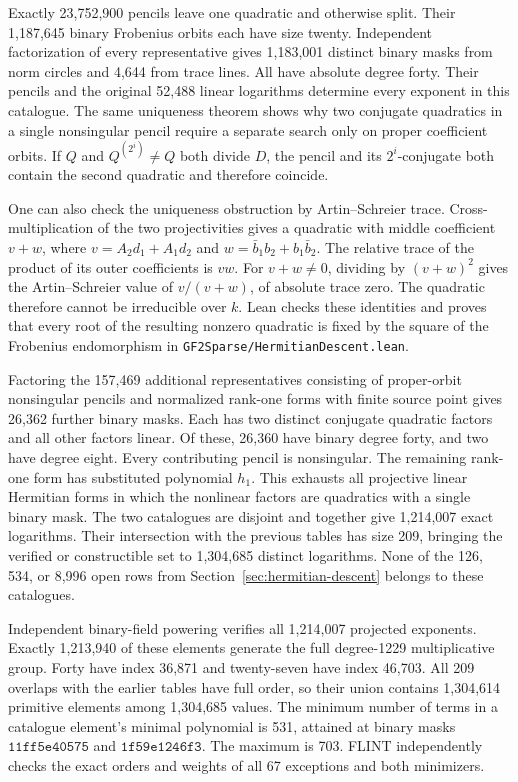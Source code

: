 \documentclass[11pt]{article}
\begin{document}
Exactly 23,752,900 pencils leave one quadratic and otherwise split.
Their 1,187,645 binary Frobenius orbits each have size twenty.
Independent factorization of every representative gives 1,183,001
distinct binary masks from norm circles and 4,644 from trace lines.
All have absolute degree forty. Their pencils and the original
52,488 linear logarithms determine every exponent in this catalogue.
The same uniqueness theorem shows why two conjugate quadratics in a
single nonsingular pencil require a separate search only on proper
coefficient orbits. If \(Q\) and \(Q^{(2^i)}\ne Q\) both divide
\(D\), the pencil and its \(2^i\)-conjugate both contain the
second quadratic and therefore coincide.

One can also check the uniqueness obstruction by Artin--Schreier
trace. Cross-multiplication of the two projectivities gives a
quadratic with middle coefficient \(v+w\), where
\(v=A_2d_1+A_1d_2\) and \(w=\bar b_1 b_2+b_1\bar b_2\).
The relative trace of the product of its outer coefficients is
\(vw\). For \(v+w\ne0\), dividing by \((v+w)^2\) gives the
Artin--Schreier value of \(v/(v+w)\), of absolute trace zero.
The quadratic therefore cannot be irreducible over \(k\).
Lean checks these identities and proves that every root of the
resulting nonzero quadratic is fixed by the square of the
Frobenius endomorphism in
\nolinkurl{GF2Sparse/HermitianDescent.lean}.

Factoring the 157,469 additional representatives consisting of
proper-orbit nonsingular pencils and normalized rank-one forms
with finite source point gives 26,362 further binary masks.
Each has two distinct conjugate quadratic factors and all other
factors linear. Of these, 26,360 have binary degree forty, and
two have degree eight. Every contributing pencil is nonsingular.
The remaining rank-one form has substituted polynomial \(h_1\).
This exhausts all projective linear Hermitian forms in which the
nonlinear factors are quadratics with a single binary mask.
The two catalogues are disjoint and together give 1,214,007 exact
logarithms. Their intersection with the previous tables has size
209, bringing the verified or constructible set to 1,304,685
distinct logarithms. None of the 126, 534, or 8,996 open rows
from Section~\ref{sec:hermitian-descent} belongs to these catalogues.

Independent binary-field powering verifies all 1,214,007 projected
exponents. Exactly 1,213,940 of these elements generate the full
degree-1229 multiplicative group. Forty have index 36,871 and
twenty-seven have index 46,703. All 209 overlaps with the earlier
tables have full order, so their union contains 1,304,614 primitive
elements among 1,304,685 values. The minimum number of terms in a
catalogue element's minimal polynomial is 531, attained at binary
masks \(\mathtt{11ff5e40575}\) and \(\mathtt{1f59e1246f3}\).
The maximum is 703. FLINT independently checks the exact orders
and weights of all 67 exceptions and both minimizers.
\end{document}
